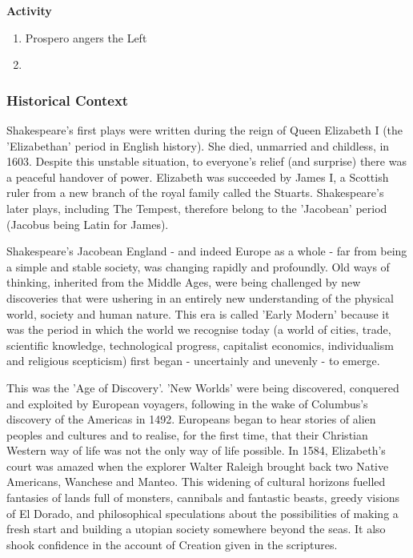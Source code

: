 			\textbf{Activity}
				\begin{enumerate}
					\item Prospero angers the Left
					\item 
				\end{enumerate}

		\subsubsection{Historical Context}
			Shakespeare's first plays were written during the reign of Queen Elizabeth I (the 'Elizabethan' period in English history). She died, unmarried and childless, in 1603. Despite this unstable situation, to everyone's relief (and surprise) there was a peaceful handover of power. Elizabeth was succeeded by James I, a Scottish ruler from a new branch of the royal family called the Stuarts. Shakespeare's later plays, including The Tempest, therefore belong to the 'Jacobean' period (Jacobus being Latin for James).

			Shakespeare's Jacobean England - and indeed Europe as a whole - far from being a simple and stable society, was changing rapidly and profoundly. Old ways of thinking, inherited from the Middle Ages, were being challenged by new discoveries that were ushering in an entirely new understanding of the physical world, society and human nature. This era is called 'Early Modern' because it was the period in which the world we recognise today (a world of cities, trade, scientific knowledge, technological progress, capitalist economics, individualism and religious scepticism) first began - uncertainly and unevenly - to emerge.

			This was the 'Age of Discovery'. 'New Worlds' were being discovered, conquered and exploited by European voyagers, following in the wake of Columbus's discovery of the Americas in 1492. Europeans began to hear stories of alien peoples and cultures and to realise, for the first time, that their Christian Western way of life was not the only way of life possible. In 1584, Elizabeth's court was amazed when the explorer Walter Raleigh brought back two Native Americans, Wanchese and Manteo. This widening of cultural horizons fuelled fantasies of lands full of monsters, cannibals and fantastic beasts, greedy visions of El Dorado, and philosophical speculations about the possibilities of making a fresh start and building a utopian society somewhere beyond the seas. It also shook confidence in the account of Creation given in the scriptures.

